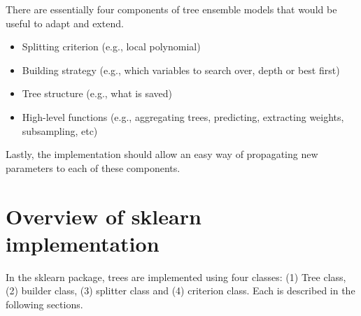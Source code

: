 \documentclass[11pt, a4paper]{article}
\begin{document}
There are essentially four components of tree ensemble models that
would be useful to adapt and extend.
\begin{itemize}
\item Splitting criterion (e.g., local polynomial)
\item Building strategy (e.g., which variables to search over, depth
  or best first)
\item Tree structure (e.g., what is saved)
\item High-level functions (e.g., aggregating trees, predicting,
  extracting weights, subsampling, etc)
\end{itemize}

Lastly, the implementation should allow an easy way of propagating new
parameters to each of these components.

\section{Overview of sklearn implementation}\label{sec:sklearn}

In the sklearn package, trees are implemented using four classes: (1)
Tree class, (2) builder class, (3) splitter class and (4) criterion
class. Each is described in the following sections.
\end{document}
